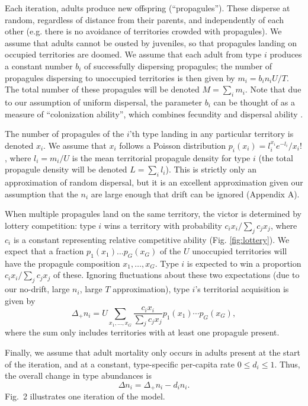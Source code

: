 \documentclass[12pt]{article}
\begin{document}
Each iteration, adults produce new offspring (``propagules''). These disperse at random, regardless of distance from their parents, and independently of each other (e.g. there is no avoidance of territories crowded with propagules). We assume that adults cannot be ousted by juveniles, so that propagules landing on occupied territories are doomed. We assume that each adult from type $i$ produces a constant number $b_i$ of successfully dispersing propagules; the number of propagules dispersing to unoccupied territories is then given by $m_i=b_in_iU/T$. The total number of these propagules will be denoted $M=\sum_i m_i$. Note that due to our assumption of uniform dispersal, the parameter $b_i$ can be thought of as a measure of ``colonization ability'', which combines fecundity and dispersal ability \citep{levins_71,tilman_94,bolker_99}. 

The number of propagules of the $i$'th type landing in any particular territory is denoted $x_i$. We assume that $x_i$ follows a Poisson distribution $p_i(x_i)=l_i^{x_i} e^{-l_i}/x_i!$, where $l_i=m_i/U$ is the mean territorial propagule density for type $i$ (the total propagule density will be denoted $L=\sum_i l_i$). This is strictly only an approximation of random dispersal, but it is an excellent approximation given our assumption that the $n_i$ are large enough that drift can be ignored (Appendix A).

When multiple propagules land on the same territory, the victor is determined by lottery competition: type $i$ wins a territory with probability $c_i x_i/\sum_j c_j x_j$, where $c_i$ is a constant representing relative competitive ability (Fig. \ref{fig:lottery}). We expect that a fraction $p_1(x_1)\ldots p_G(x_G)$ of the $U$ unoccupied territories will have the propagule composition $x_1,\ldots,x_G$. Type $i$ is expected to win a proportion $c_i x_i/\sum_j c_j x_j$ of these. Ignoring fluctuations about these two expectations (due to our no-drift, large $n_i$, large $T$ approximation), type $i$'s territorial acquisition is given by
\begin{equation}
\Delta_+ n_i=U\sum_{x_1,\ldots,x_G} \frac{c_i x_i}{\sum_j c_j x_j} p_1(x_1)\cdots p_G(x_G), \label{eq:growthsumuncoupled}
\end{equation}
where the sum only includes territories with at least one propagule present.

Finally, we assume that adult mortality only occurs in adults present at the start of the  iteration, and at a constant, type-specific per-capita rate $0\leq d_i\leq 1$. Thus, the overall change in type abundances is
\begin{equation}
\Delta n_i=\Delta_+ n_i-d_i n_i. \label{eq:delttot}
\end{equation}
Fig.~2 illustrates one iteration of the model. 
\end{document}
